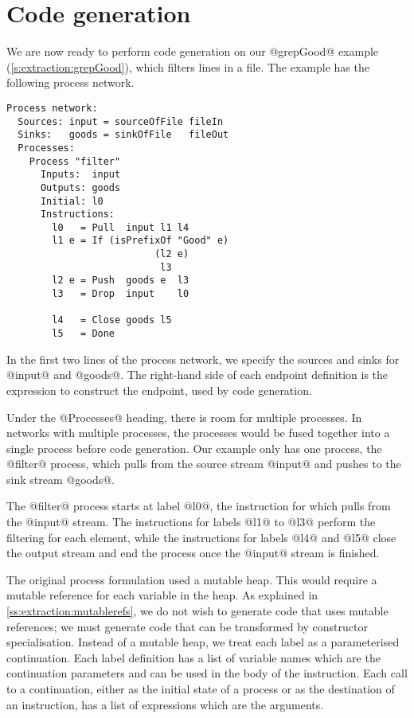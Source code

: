\section{Code generation}
We are now ready to perform code generation on our @grepGood@ example (\cref{s:extraction:grepGood}), which filters lines in a file.
The example has the following process network.

\begin{lstlisting}
Process network:
  Sources: input = sourceOfFile fileIn
  Sinks:   goods = sinkOfFile   fileOut
  Processes:
    Process "filter"
      Inputs:  input
      Outputs: goods
      Initial: l0
      Instructions:
        l0   = Pull  input l1 l4
        l1 e = If (isPrefixOf "Good" e)
                          (l2 e)
                           l3
        l2 e = Push  goods e  l3
        l3   = Drop  input    l0

        l4   = Close goods l5
        l5   = Done
\end{lstlisting}

In the first two lines of the process network, we specify the sources and sinks for @input@ and @goods@.
The right-hand side of each endpoint definition is the expression to construct the endpoint, used by code generation.

Under the @Processes@ heading, there is room for multiple processes.
In networks with multiple processes, the processes would be fused together into a single process before code generation.
Our example only has one process, the @filter@ process, which pulls from the source stream @input@ and pushes to the sink stream @goods@.

The @filter@ process starts at label @l0@, the instruction for which pulls from the @input@ stream.
The instructions for labels @l1@ to @l3@ perform the filtering for each element, while the instructions for labels @l4@ and @l5@ close the output stream and end the process once the @input@ stream is finished.

The original process formulation  used a mutable heap.
This would require a mutable reference for each variable in the heap.
As explained in \cref{ss:extraction:mutablerefs}, we do not wish to generate code that uses mutable references; we must generate code that can be transformed by constructor specialisation.
Instead of a mutable heap, we treat each label as a parameterised continuation.
Each label definition has a list of variable names which are the continuation parameters and can be used in the body of the instruction.
Each call to a continuation, either as the initial state of a process or as the destination of an instruction, has a list of expressions which are the arguments.

